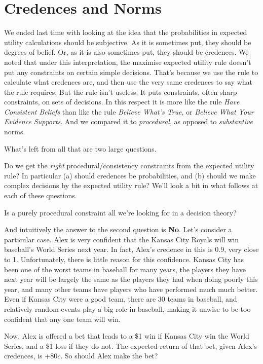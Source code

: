 \section{Credences and Norms}
We ended last time with looking at the idea that the probabilities in expected utility calculations should be subjective. As it is sometimes put, they should be degrees of belief. Or, as it is also sometimes put, they should be credences. We noted that under this interpretation, the maximise expected utility rule doesn't put any constraints on certain simple decisions. That's because we use the rule to calculate what credences are, and then use the very same credences to say what the rule requires. But the rule isn't useless. It puts constraints, often sharp constraints, on sets of decisions. In this respect it is more like the rule \textit{Have Consistent Beliefs} than like the rule \textit{Believe What's True}, or \textit{Believe What Your Evidence Supports}. And we compared it to \textit{procedural}, as opposed to \textit{substantive} norms.

What's left from all that are two large questions.

\begin{itemize*}
\item Do we get the \textit{right} procedural/consistency constraints from the expected utility rule? In particular (a) should credences be probabilities, and (b) should we make complex decisions by the expected utility rule? We'll look a bit in what follows at each of these questions.
\item Is a purely procedural constraint all we're looking for in a decision theory?
\end{itemize*}

And intuitively the answer to the second question is \textbf{No}. Let's consider a particular case. Alex is very confident that the Kansas City Royals will win baseball's World Series next year. In fact, Alex's credence in this is 0.9, very close to 1. Unfortunately, there is little reason for this confidence. Kansas City has been one of the worst teams in baseball for many years, the players they have next year will be largely the same as the players they had when doing poorly this year, and many other teams have players who have performed much much better. Even if Kansas City were a good team, there are 30 teams in baseball, and relatively random events play a big role in baseball, making it unwise to be too confident that any one team will win.

Now, Alex is offered a bet that leads to a \$1 win if Kansas City win the World Series, and a \$1 loss if they do not. The expected return of that bet, given Alex's credences, is +80$c$. So should Alex make the bet?

